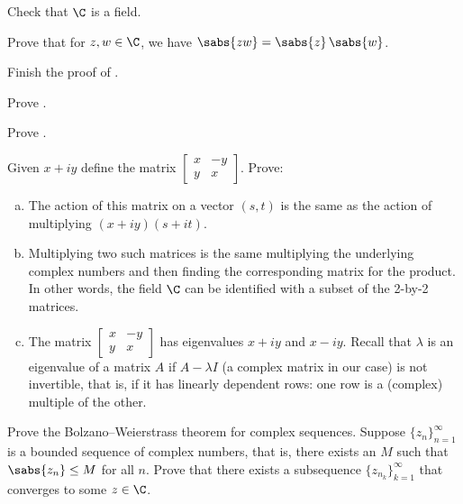 \begin{exercise}
Check that $\C$ is a field.
\end{exercise}

\begin{exercise}
Prove that for $z,w \in \C$, we have
$\sabs{zw} = \sabs{z} \, \sabs{w}$.
\end{exercise}

\begin{exercise}
Finish the proof of .
\end{exercise}

\begin{exercise}
Prove .
\end{exercise}

\begin{exercise}
Prove .
\end{exercise}

\begin{samepage}
\begin{exercise}
Given $x +iy$ define the matrix
$\left[ \begin{smallmatrix} x & -y \\ y & x \end{smallmatrix} \right]$.
Prove:
\begin{enumerate}[a)]
\item
The action of this matrix on a vector $(s,t)$ is the same
as the action of multiplying $(x+iy)(s+it)$.
\item
Multiplying two such matrices is the same multiplying the underlying complex
numbers and then finding the corresponding matrix for the product.
In other words, the field $\C$ can be identified with a subset of the 2-by-2 matrices.
\item
The matrix
$\left[ \begin{smallmatrix} x & -y \\ y & x \end{smallmatrix} \right]$
has eigenvalues $x+iy$ and $x-iy$.  Recall that $\lambda$ is
an eigenvalue of a matrix $A$ if $A-\lambda I$ (a complex matrix in our case)
is not invertible, that is,
if it has linearly dependent rows: one row is a (complex) multiple
of the other.
\end{enumerate}
\end{exercise}
\end{samepage}

\begin{exercise}
Prove the Bolzano--Weierstrass theorem for complex sequences.
Suppose $\{ z_n \}_{n=1}^\infty$ is a bounded sequence of complex numbers, that
is, there exists an $M$ such that $\sabs{z_n} \leq M$ for all $n$.  Prove
that there exists a subsequence $\{ z_{n_k} \}_{k=1}^\infty$ that converges to some $z
\in \C$.
\end{exercise}

